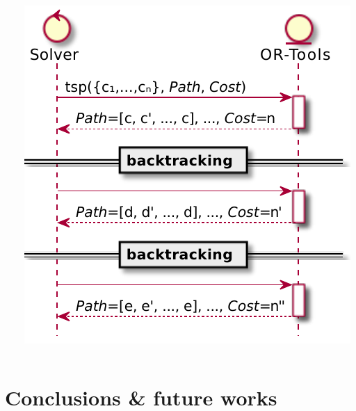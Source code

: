 \documentclass[presentation]{beamer}
\begin{document}
\begin{frame}
\begin{columns}
\begin{column}{.62\linewidth}
\begin{itemize}
            \end{itemize}
        \end{column}
        \begin{column}{.38\linewidth}
            \includegraphics[width=\linewidth]{img/or-tools.pdf}
        \end{column}
    \end{columns}

\end{frame}

\section{Conclusions \& future works}
\end{document}
